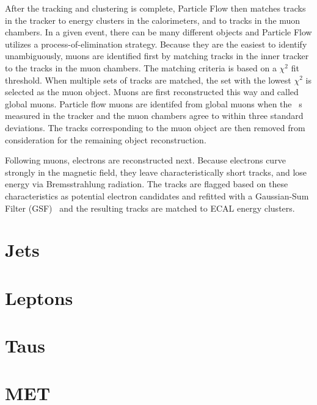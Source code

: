 After the tracking and clustering is complete, Particle Flow then matches tracks in the tracker to energy clusters in the calorimeters, and to tracks in the muon chambers.
In a given event, there can be many different objects and Particle Flow utilizes
a process-of-elimination strategy. Because they are the easiest to identify unambiguously, muons are identified first by matching tracks in the inner tracker to the tracks in
the muon chambers. The matching criteria is based on a $\chi^{2}$ fit threshold. When multiple sets of tracks are matched, the set with the lowest $\chi^{2}$ is selected as the
muon object. Muons are first reconstructed this way and called global muons. Particle flow muons are identifed from global muons when the \pt~s measured in the tracker and the
muon chambers agree to within three standard deviations. The tracks corresponding to the muon object are then removed from consideration for the remaining object reconstruction. 

Following muons, electrons are reconstructed next. Because electrons curve strongly in the magnetic field, they leave characteristically short tracks, and lose energy via
Bremsstrahlung radiation. The tracks are flagged based on these characteristics as potential electron candidates and refitted with a Gaussian-Sum Filter (GSF)~\cite{gsf} and the
resulting tracks are matched to ECAL energy clusters. 



\section{Jets}
\section{Leptons}
\section{Taus}
\section{MET}

